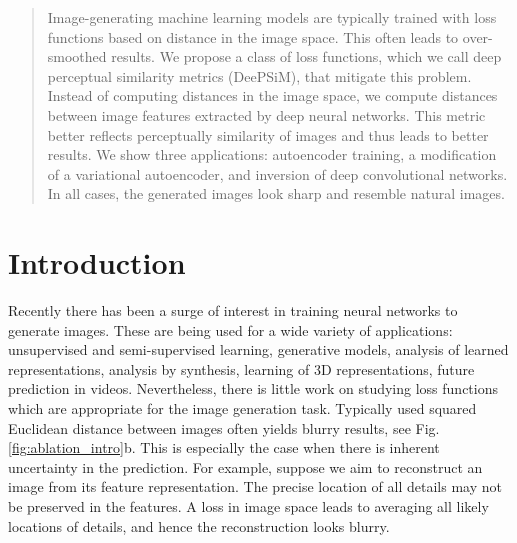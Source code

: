 \documentclass{article}
\begin{document}
 


\begin{abstract}
Image-generating machine learning models are typically trained with loss functions based on distance in the image space.
This often leads to over-smoothed results.
We propose a class of loss functions, which we call deep perceptual similarity metrics (DeePSiM), that mitigate this problem. 
Instead of computing distances in the image space, we compute distances between image features extracted by deep neural networks.
This metric better reflects perceptually similarity of images and thus leads to better results.
We show three applications: autoencoder training, a modification of a variational autoencoder, and inversion of deep convolutional networks.
In all cases, the generated images look sharp and resemble natural images.
\end{abstract}


\section{Introduction}
Recently there has been a surge of interest in training neural networks to generate images.
These are being used for a wide variety of applications: unsupervised and semi-supervised learning, generative models, analysis of learned representations, analysis by synthesis, learning of 3D representations, future prediction in videos.
Nevertheless, there is little work on studying loss functions which are appropriate for the image generation task.
Typically used squared Euclidean distance between images often yields blurry results, see Fig.\ref{fig:ablation_intro}b.
This is especially the case when there is inherent uncertainty in the prediction.
For example, suppose we aim to reconstruct an image from its feature representation.
The precise location of all details may not be preserved in the features.
A loss in image space leads to averaging all likely locations of details, and hence the reconstruction looks blurry.
\end{document}
